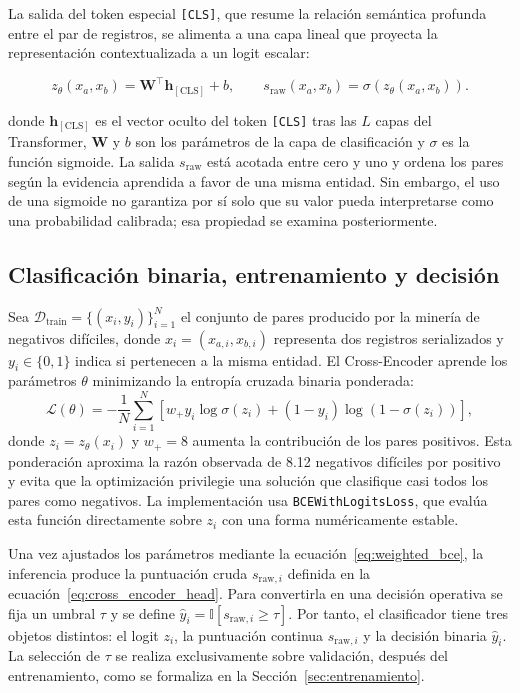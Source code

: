 La salida del token especial \texttt{[CLS]}, que resume la relación semántica profunda entre el par de registros, se alimenta a una capa lineal que proyecta la representación contextualizada a un logit escalar:

\begin{equation}
\label{eq:cross_encoder_head}
z_\theta(x_a,x_b) = \mathbf{W}^{\top} \mathbf{h}_{[\text{CLS}]} + b,
\qquad
s_{\mathrm{raw}}(x_a,x_b)=\sigma\left(z_\theta(x_a,x_b)\right).
\end{equation}

donde $\mathbf{h}_{[\text{CLS}]}$ es el vector oculto del token \texttt{[CLS]} tras las $L$ capas del Transformer, $\mathbf{W}$ y $b$ son los parámetros de la capa de clasificación y $\sigma$ es la función sigmoide. La salida $s_{\mathrm{raw}}$ está acotada entre cero y uno y ordena los pares según la evidencia aprendida a favor de una misma entidad. Sin embargo, el uso de una sigmoide no garantiza por sí solo que su valor pueda interpretarse como una probabilidad calibrada; esa propiedad se examina posteriormente.

\subsection{Clasificación binaria, entrenamiento y decisión}

Sea $\mathcal{D}_{\mathrm{train}}=\{(x_i,y_i)\}_{i=1}^{N}$ el conjunto de pares producido por la minería de negativos difíciles, donde $x_i=(x_{a,i},x_{b,i})$ representa dos registros serializados y $y_i\in\{0,1\}$ indica si pertenecen a la misma entidad. El Cross-Encoder aprende los parámetros $\theta$ minimizando la entropía cruzada binaria ponderada:
\begin{equation}
    \mathcal{L}(\theta)=-\frac{1}{N}\sum_{i=1}^{N}\left[w_{+}y_i\log\sigma(z_i)+(1-y_i)\log\left(1-\sigma(z_i)\right)\right],
    \label{eq:weighted_bce}
\end{equation}
donde $z_i=z_\theta(x_i)$ y $w_{+}=8$ aumenta la contribución de los pares positivos. Esta ponderación aproxima la razón observada de 8.12 negativos difíciles por positivo y evita que la optimización privilegie una solución que clasifique casi todos los pares como negativos. La implementación usa \texttt{BCEWithLogitsLoss}, que evalúa esta función directamente sobre $z_i$ con una forma numéricamente estable.

Una vez ajustados los parámetros mediante la ecuación~\ref{eq:weighted_bce}, la inferencia produce la puntuación cruda $s_{\mathrm{raw},i}$ definida en la ecuación~\ref{eq:cross_encoder_head}. Para convertirla en una decisión operativa se fija un umbral $\tau$ y se define $\hat{y}_i=\mathbb{I}[s_{\mathrm{raw},i}\geq\tau]$. Por tanto, el clasificador tiene tres objetos distintos: el logit $z_i$, la puntuación continua $s_{\mathrm{raw},i}$ y la decisión binaria $\hat{y}_i$. La selección de $\tau$ se realiza exclusivamente sobre validación, después del entrenamiento, como se formaliza en la Sección~\ref{sec:entrenamiento}.

